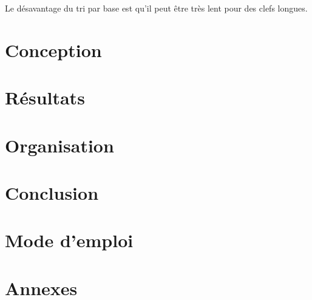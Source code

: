 \documentclass[12pt]{article}
\begin{document}
\hspace{1.0 cm}Le désavantage du tri par base est qu'il peut être très lent pour des clefs longues. 



\section{Conception}
\newpage 

\section{Résultats}
\newpage 
\section{Organisation}
\newpage 
\section{Conclusion}

\newpage

\section{Mode d'emploi}

\newpage
\section{Annexes}
%
%
\end{document}
